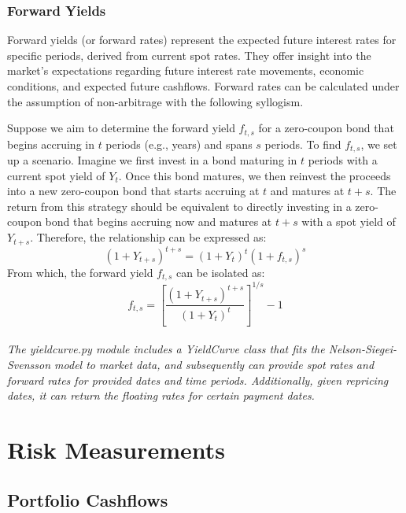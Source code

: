 \documentclass[11pt]{report}
\begin{document}
 \subsection{Forward Yields}

Forward yields (or forward rates) represent the expected future interest rates for specific periods, derived from current spot rates. They offer insight into the market's expectations regarding future interest rate movements, economic conditions, and expected future cashflows. Forward rates can be calculated under the assumption of non-arbitrage with the following syllogism. 

Suppose we aim to determine the forward yield \(f_{t,s}\) for a zero-coupon bond that begins accruing in \(t\) periods (e.g., years) and spans \(s\) periods. To find \(f_{t,s}\), we set up a scenario. Imagine we first invest in a bond maturing in \(t\) periods with a current spot yield of \(Y_t\). Once this bond matures, we then reinvest the proceeds into a new zero-coupon bond that starts accruing at \(t\) and matures at \(t+s\). The return from this strategy should be equivalent to directly investing in a zero-coupon bond that begins accruing now and matures at \(t+s\) with a spot yield of \(Y_{t+s}\). Therefore, the relationship can be expressed as:
\begin{equation}
(1 + Y_{t+s})^{t+s} = (1 + Y_t)^t(1 + f_{t,s})^s
\end{equation}
From which, the forward yield \(f_{t,s}\) can be isolated as:
\begin{equation}
f_{t,s} = \left[ \frac{(1 + Y_{t+s})^{t+s}}{(1 + Y_t)^t} \right]^{1/s} - 1
\label{forward_rates}
\end{equation}
\\

\textit{The yieldcurve.py module includes a YieldCurve class that fits the Nelson-Siegei-Svensson model to market data, and subsequently can provide spot rates and forward rates for provided dates and time periods. Additionally, given repricing dates, it can return the floating rates for certain payment dates.
}


\chapter{Risk Measurements}

\section{Portfolio Cashflows}
\end{document}
